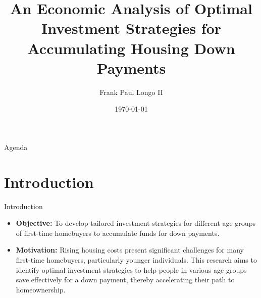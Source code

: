 \documentclass{beamer}
\title{An Economic Analysis of Optimal Investment Strategies for Accumulating Housing Down Payments}
\author{Frank Paul Longo II}
\date{\today}
\begin{document}
\begin{frame}
    \titlepage
\end{frame}

\begin{frame}{Agenda}
    \tableofcontents
\end{frame}

\section{Introduction}
\begin{frame}{Introduction}
  \begin{itemize}
    \item \textbf{Objective:} To develop tailored investment strategies for different age groups of first-time homebuyers to accumulate funds for down payments.
    \item \textbf{Motivation:} Rising housing costs present significant challenges for many first-time homebuyers, particularly younger individuals. This research aims to identify optimal investment strategies to help people in various age groups save effectively for a down payment, thereby accelerating their path to homeownership.
  \end{itemize}
\end{frame}
\end{document}
